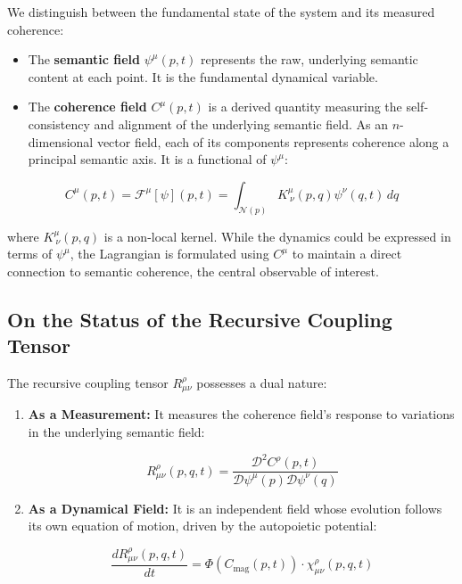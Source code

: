 We distinguish between the fundamental state of the system and its measured coherence:

\begin{itemize}

    \item The \textbf{semantic field} \(\psi^\mu(p,t)\) represents the raw, underlying semantic content at each point. It is the fundamental dynamical variable.

    \item The \textbf{coherence field} \(C^\mu(p,t)\) is a derived quantity measuring the self-consistency and alignment of the underlying semantic field. As an \(n\)-dimensional vector field, each of its components represents coherence along a principal semantic axis. It is a functional of \(\psi^\mu\):

\end{itemize}

\begin{equation}
C^\mu(p,t) = \mathcal{F}^\mu[\psi](p,t) = \int_{\mathcal{N}(p)} K^\mu_{\ \nu}(p,q) \psi^\nu(q,t) \, dq
\end{equation}

where \(K^\mu_{\ \nu}(p,q)\) is a non-local kernel. While the dynamics could be expressed in terms of \(\psi^\mu\), the Lagrangian is formulated using \(C^\mu\) to maintain a direct connection to semantic coherence, the central observable of interest.


\subsection{On the Status of the Recursive Coupling Tensor}
\label{2.4.7:on_the_status_of_the_recursive_coupling_tensor}

The recursive coupling tensor \(R^\rho_{\mu\nu}\) possesses a dual nature:

\begin{enumerate}

    \item \textbf{As a Measurement:} It measures the coherence field's response to variations in the underlying semantic field:

    \begin{equation}
    \label{eq:R_measurement}
    R^\rho_{\mu\nu}(p, q, t) = \frac{\mathcal{D}^2 C^\rho(p,t)}{\mathcal{D} \psi^\mu(p) \mathcal{D} \psi^\nu(q)}
    \end{equation}

    \item \textbf{As a Dynamical Field:} It is an independent field whose evolution follows its own equation of motion, driven by the autopoietic potential:

    \begin{equation}
    \label{eq:R_dynamical}
    \frac{dR^\rho_{\mu\nu}(p,q,t)}{dt} = \Phi(C_{\mathrm{mag}}(p,t)) \cdot \chi^\rho_{\mu\nu}(p,q,t)
    \end{equation}

\end{enumerate}

